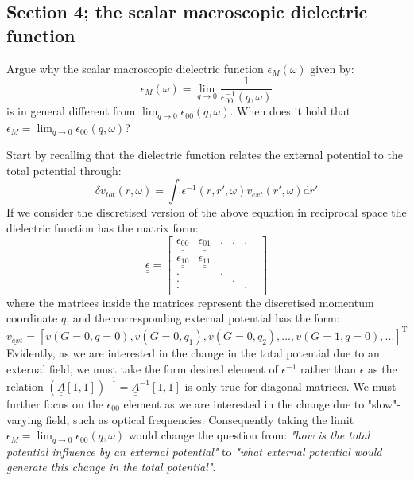 \subsection{Section 4; the scalar macroscopic dielectric function}
\begin{exercise}
Argue why the scalar macroscopic dielectric function $\epsilon_M(\omega)$ given by:
\begin{equation}
    \epsilon_M(\omega) = \lim_{q\rightarrow 0} \dfrac{1}{\epsilon_{00}^{-1}(q,\omega)}
\end{equation} 
is in general different from $\lim_{q\rightarrow 0} \epsilon_{00}(q,\omega)$. When does it hold that \\ $\epsilon_M = \lim_{q\rightarrow 0} \epsilon_{00}(q,\omega)$?
\end{exercise}
\begin{solution}
Start by recalling that the dielectric function relates the external potential to the total potential through:
\begin{equation}
    \delta v_{tot}(r,\omega) = \int \epsilon^{-1}(r,r',\omega)v_{ext}(r',\omega)\mathrm{d}r'
\end{equation}
If we consider the discretised version of the above equation in reciprocal space the dielectric function has the matrix form:
\begin{equation}
    \underline{\underline{\epsilon}} = \begin{bmatrix}
    \underline{\underline{\epsilon_{00}}} & \underline{\underline{\epsilon_{01}}} &.&.&.\\
    \underline{\underline{\epsilon_{10}}} & \underline{\underline{\epsilon_{11}}} & & & \\
    .& &.& & & \\
    .& & &.& & \\
    .& & & &.& \\
    \end{bmatrix}
\end{equation}
where the matrices inside the matrices represent the discretised momentum coordinate $q$, and the corresponding external potential has the form:
\begin{equation}
   \underline{v_{ext}} = [v(G=0,q=0),v(G=0,q_1),v(G=0,q_2),...,v(G=1,q=0),...]^{\mathrm{T}} 
\end{equation}
Evidently, as we are interested in the change in the total potential due to an external field, we must take the form desired element of $\epsilon^{-1}$ rather than $\epsilon$ as the relation $(\underline{\underline{A}}[1,1])^{-1} = \underline{\underline{A}}^{-1}[1,1]$ is only true for diagonal matrices. We must further focus on the $\epsilon_{00}$ element as we are interested in the change due to "slow"-varying field, such as optical frequencies. Consequently taking the limit $\epsilon_M = \lim_{q\rightarrow 0} \epsilon_{00}(q,\omega)$ would change the question from: \emph{"how is the total potential influence by an external potential"} to \emph{"what external potential would generate this change in the total potential"}.
\end{solution}